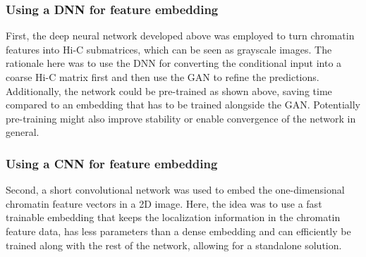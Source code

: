 
\subsubsection{Using a DNN for feature embedding} \label{sec:improve:DNN_embedding}
First, the deep neural network developed above was employed to turn chromatin features into Hi-C submatrices, which can be seen as grayscale images.
The rationale here was to use the DNN for converting the conditional input into a coarse Hi-C matrix first and then
use the GAN to refine the predictions.
Additionally, the network could be pre-trained as shown above, saving time compared to an embedding that has to be trained alongside the GAN.
Potentially pre-training might also improve stability or enable convergence of the network in general.

\subsubsection{Using a CNN for feature embedding} \label{sec:improve:CNN_embedding}
Second, a short convolutional network was used to embed the one-dimensional chromatin feature vectors in a 2D image.
Here, the idea was to use a fast trainable embedding that keeps the localization information in the chromatin feature data,
has less parameters than a dense embedding and can efficiently be trained along with the rest of the network, allowing for a standalone solution.














